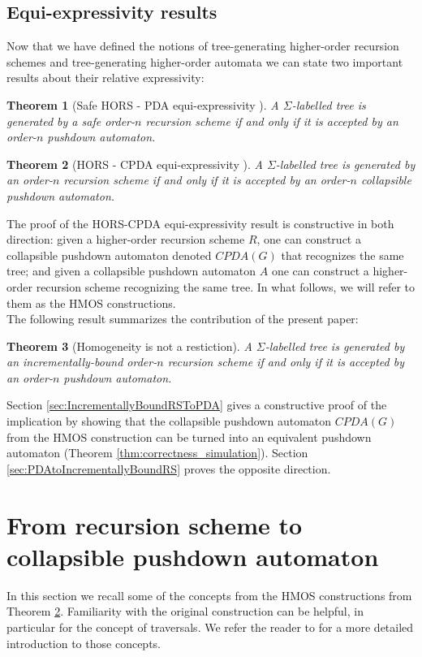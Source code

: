 \documentclass[a4paper]{article}[12pt]
\newtheorem{theorem}{Theorem}[section]
\theoremstyle{remark}
\theoremstyle{definition}
\begin{document}
\subsection{Equi-expressivity results}

Now that we have defined the notions of tree-generating higher-order recursion schemes and
tree-generating higher-order automata we can state two important results about their relative expressivity:

\begin{theorem}[Safe HORS - PDA equi-expressivity \cite{KNU02}]
A $\Sigma$-labelled tree is generated by a \emph{safe} order-$n$ recursion scheme if and only if it is accepted by an order-$n$ pushdown automaton.
\end{theorem}

\begin{theorem}[HORS - CPDA equi-expressivity \cite{hmos-lics08}]
	\label{thm:HMOS-equiexpr}
	A $\Sigma$-labelled tree is generated by an order-$n$ recursion scheme if and only if it is accepted by an order-$n$ collapsible pushdown automaton.
\end{theorem}
The proof of the HORS-CPDA equi-expressivity result is constructive in both direction: given a higher-order recursion scheme $R$, one can construct a collapsible pushdown automaton denoted $CPDA(G)$ that recognizes the same tree; and given a collapsible pushdown automaton $A$ one can construct a higher-order recursion scheme recognizing the same tree. In what follows, we will refer to them as the HMOS constructions.
\\

The following result summarizes the contribution of the present paper:
\begin{theorem}[Homogeneity is not a restiction]
	A $\Sigma$-labelled tree is generated by an \emph{incrementally-bound} order-$n$ recursion scheme if and only if it is accepted by an order-$n$ pushdown automaton.
\end{theorem}
Section \ref{sec:IncrementallyBoundRSToPDA} gives a constructive proof of the implication by showing that the collapsible pushdown automaton $CPDA(G)$ from the HMOS construction can be turned into an equivalent pushdown automaton (Theorem \ref{thm:correctness_simulation}).
Section \ref{sec:PDAtoIncrementallyBoundRS} proves the opposite direction.


\section{From recursion scheme to collapsible pushdown automaton}
In this section we recall some of the concepts from the HMOS constructions from Theorem \ref{thm:HMOS-equiexpr}. Familiarity with the original construction can be helpful, in particular for the concept of traversals. We refer the reader to \cite{hmos-lics08} for a more detailed introduction to those concepts.
\end{document}
